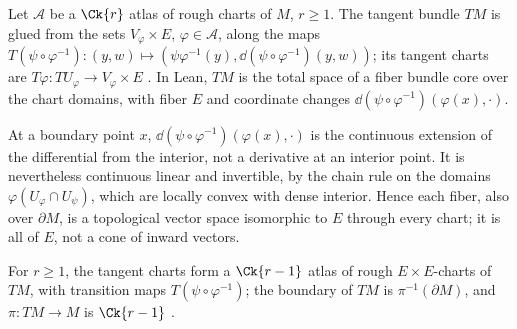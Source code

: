\begin{definition}
  \label{def:rough-tangent-bundle}
  \leanok
  Let $\mathcal{A}$ be a $\Ck{r}$ atlas of rough charts of $M$, $r \ge 1$. The tangent bundle
  $TM$ is glued from the sets $V_\varphi \times E$, $\varphi \in \mathcal{A}$, along the
  maps $T(\psi \circ \varphi^{-1})\colon (y, w) \mapsto (\psi\varphi^{-1}(y),
  \dd(\psi \circ \varphi^{-1})(y, w))$; its tangent charts are
  $T\varphi\colon TU_\varphi \to V_\varphi \times E$
  \cite[3.5.22, p.~285; Definitions 3.3.5 and 3.3.7, p.~257]{GN26}. In Lean, $TM$ is the total
  space of a fiber bundle core over the chart domains, with fiber $E$ and coordinate changes
  $\dd(\psi \circ \varphi^{-1})(\varphi(x), \cdot)$.
\end{definition}

\begin{remark}
  \label{rem:rough-tangent-linear}
  At a boundary point $x$, $\dd(\psi \circ \varphi^{-1})(\varphi(x), \cdot)$ is the
  continuous extension of the differential from the interior, not a derivative at an interior
  point. It is nevertheless continuous linear \cite[Lemma 1.4.7]{GN26} and invertible, by the
  chain rule \cite[Proposition 1.4.10]{GN26} on the domains $\varphi(U_\varphi \cap U_\psi)$,
  which are locally convex with dense interior. Hence each fiber, also over $\partial M$, is a
  topological vector space isomorphic to $E$ through every chart; it is all of $E$, not a cone of
  inward vectors.
\end{remark}

\begin{theorem}
  \label{thm:rough-tangent-atlas}
  \leanok
  For $r \ge 1$, the tangent charts form a $\Ck{r-1}$ atlas of rough $E \times E$-charts of
  $TM$, with transition maps $T(\psi \circ \varphi^{-1})$; the boundary of $TM$ is
  $\pi^{-1}(\partial M)$, and $\pi\colon TM \to M$ is $\Ck{r-1}$
  \cite[3.5.22, p.~285; Lemma 3.3.8, p.~258]{GN26}.
\end{theorem}

